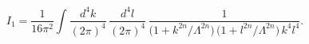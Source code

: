 \begin{equation}
I_1 = \frac{1}{16\pi^2}
\int \frac{d^4k}{(2\pi)^4}\,
\frac{d^4l}{(2\pi)^4}\,
\frac{1}{\Big(1+k^{2n}/\Lambda^{2n}\Big)\,
\Big(1+l^{2n}/\Lambda^{2n}\Big)\,k^4 l^4}.
\end{equation}

